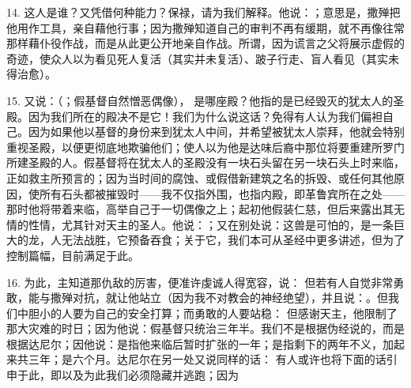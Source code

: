 14. 这人是谁？又凭借何种能力？保禄，请为我们解释。他说：；意思是，撒殚把他用作工具，亲自藉他行事；因为撒殚知道自己的审判不再有缓期，就不再像往常那样藉仆役作战，而是从此更公开地亲自作战。所谓，因为谎言之父将展示虚假的奇迹，使众人以为看见死人复活（其实并未复活）、跛子行走、盲人看见（其实未得治愈）。\par

15. 又说：（；假基督自然憎恶偶像）， 是哪座殿？他指的是已经毁灭的犹太人的圣殿。因为我们所在的殿决不是它！我们为什么说这话？免得有人认为我们偏袒自己。因为如果他以基督的身份来到犹太人中间，并希望被犹太人崇拜，他就会特别重视圣殿，以便更彻底地欺骗他们；使人以为他是达味后裔中那位将要重建所罗门所建圣殿的人。假基督将在犹太人的圣殿没有一块石头留在另一块石头上时来临，正如救主所预言的；因为当时间的腐蚀、或假借新建筑之名的拆毁、或任何其他原因，使所有石头都被摧毁时——我不仅指外围，也指内殿，即革鲁宾所在之处——那时他将带着来临，高举自己于一切偶像之上；起初他假装仁慈，但后来露出其无情的性情，尤其针对天主的圣人。他说：；又在别处说：这兽是可怕的，是一条巨大的龙，人无法战胜，它预备吞食；关于它，我们本可从圣经中更多讲述，但为了控制篇幅，目前满足于此。\par

16. 为此，主知道那仇敌的厉害，便准许虔诚人得宽容，说： 但若有人自觉非常勇敢，能与撒殚对抗，就让他站立（因为我不对教会的神经绝望），并且说：。但我们中胆小的人要为自己的安全打算；而勇敢的人要站稳： 但感谢天主，他限制了那大灾难的时日；因为他说：假基督只统治三年半。我们不是根据伪经说的，而是根据达尼尔；因他说：是指他来临后暂时扩张的一年；是指剩下的两年不义，加起来共三年；是六个月。达尼尔在另一处又说同样的话： 有人或许也将下面的话引申于此，即以及为此我们必须隐藏并逃跑；因为\par

